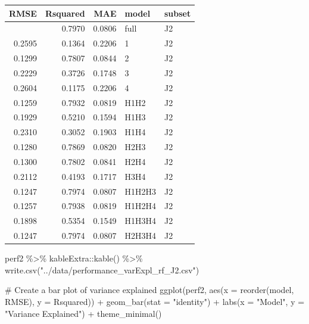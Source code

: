 \documentclass[
  letterpaper,
  DIV=11,
  numbers=noendperiod]{scrreprt}
\newenvironment{Shaded}{\begin{snugshade}}{\end{snugshade}}
\newcommand{\AttributeTok}[1]{\textcolor[rgb]{0.40,0.45,0.13}{#1}}
\newcommand{\CommentTok}[1]{\textcolor[rgb]{0.37,0.37,0.37}{#1}}
\newcommand{\FunctionTok}[1]{\textcolor[rgb]{0.28,0.35,0.67}{#1}}
\newcommand{\NormalTok}[1]{\textcolor[rgb]{0.00,0.23,0.31}{#1}}
\newcommand{\SpecialCharTok}[1]{\textcolor[rgb]{0.37,0.37,0.37}{#1}}
\newcommand{\StringTok}[1]{\textcolor[rgb]{0.13,0.47,0.30}{#1}}
\begin{document}
\begin{longtable}[]{@{}rrrll@{}}
\toprule\noalign{}
RMSE & Rsquared & MAE & model & subset \\
\midrule\noalign{}
\endhead
\bottomrule\noalign{}
\endlastfoot
0.1248 & 0.7970 & 0.0806 & full & J2 \\
0.2595 & 0.1364 & 0.2206 & 1 & J2 \\
0.1299 & 0.7807 & 0.0844 & 2 & J2 \\
0.2229 & 0.3726 & 0.1748 & 3 & J2 \\
0.2604 & 0.1175 & 0.2206 & 4 & J2 \\
0.1259 & 0.7932 & 0.0819 & H1H2 & J2 \\
0.1929 & 0.5210 & 0.1594 & H1H3 & J2 \\
0.2310 & 0.3052 & 0.1903 & H1H4 & J2 \\
0.1280 & 0.7869 & 0.0820 & H2H3 & J2 \\
0.1300 & 0.7802 & 0.0841 & H2H4 & J2 \\
0.2112 & 0.4193 & 0.1717 & H3H4 & J2 \\
0.1247 & 0.7974 & 0.0807 & H1H2H3 & J2 \\
0.1257 & 0.7938 & 0.0819 & H1H2H4 & J2 \\
0.1898 & 0.5354 & 0.1549 & H1H3H4 & J2 \\
0.1247 & 0.7974 & 0.0807 & H2H3H4 & J2 \\
\end{longtable}

\begin{Shaded}
\begin{Highlighting}[]
\NormalTok{perf2 }\SpecialCharTok{\%\textgreater{}\%} 
\NormalTok{    kableExtra}\SpecialCharTok{::}\FunctionTok{kable}\NormalTok{() }\SpecialCharTok{\%\textgreater{}\%} 
    \FunctionTok{write.csv}\NormalTok{(}\StringTok{"../data/performance\_varExpl\_rf\_J2.csv"}\NormalTok{)}

\CommentTok{\# Create a bar plot of variance explained}
\FunctionTok{ggplot}\NormalTok{(perf2, }\FunctionTok{aes}\NormalTok{(}\AttributeTok{x =} \FunctionTok{reorder}\NormalTok{(model, RMSE), }\AttributeTok{y =}\NormalTok{ Rsquared)) }\SpecialCharTok{+}
  \FunctionTok{geom\_bar}\NormalTok{(}\AttributeTok{stat =} \StringTok{"identity"}\NormalTok{) }\SpecialCharTok{+}
  \FunctionTok{labs}\NormalTok{(}\AttributeTok{x =} \StringTok{"Model"}\NormalTok{, }\AttributeTok{y =} \StringTok{"Variance Explained"}\NormalTok{) }\SpecialCharTok{+}
  \FunctionTok{theme\_minimal}\NormalTok{()}
\end{Highlighting}
\end{Shaded}
\end{document}

